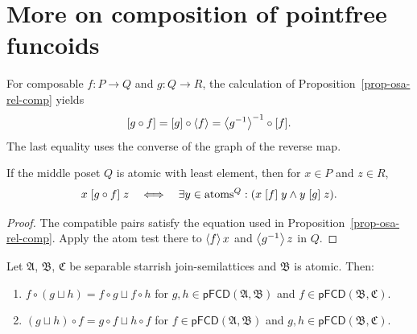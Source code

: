 \section{More on composition of pointfree funcoids}
For composable $f:P\to Q$ and $g:Q\to R$, the calculation of
Proposition~\ref{prop-osa-rel-comp} yields
\[
 \mathord{\mathrel{\left[g\circ f\right]}}
 =\mathord{\mathrel{\left[g\right]}}\circ\left\langle f\right\rangle
 =\left\langle g^{-1}\right\rangle^{-1}\circ\mathord{\mathrel{\left[f\right]}}.
\]
The last equality uses the converse of the graph of the reverse map.
\begin{thm}\label{pf-fcd-atom-middle}
If the middle poset $Q$ is atomic with least element, then for
$x\in P$ and $z\in R$,
\[
 x\mathrel{\left[g\circ f\right]}z\quad\Longleftrightarrow\quad
 \exists y\in\operatorname{atoms}^Q:(x\mathrel{\left[f\right]}y\land y\mathrel{\left[g\right]}z).
\]
\end{thm}
\begin{proof}
The compatible pairs satisfy the equation used in
Proposition~\ref{prop-osa-rel-comp}. Apply the atom test there to
$\left\langle f\right\rangle x$ and $\left\langle g^{-1}\right\rangle z$ in $Q$.
\end{proof}
\begin{thm}
Let $\mathfrak{A}$, $\mathfrak{B}$, $\mathfrak{C}$ be separable
starrish join-semilattices and $\mathfrak{B}$ is atomic. Then:
\begin{enumerate}
\item $f\circ(g\sqcup h)=f\circ g\sqcup f\circ h$ for $g,h\in\mathsf{pFCD}(\mathfrak{A},\mathfrak{B})$
and $f\in\mathsf{pFCD}(\mathfrak{B},\mathfrak{C})$.
\item $(g\sqcup h)\circ f=g\circ f\sqcup h\circ f$ for $f\in\mathsf{pFCD}(\mathfrak{A},\mathfrak{B})$
and $g,h\in\mathsf{pFCD}(\mathfrak{B},\mathfrak{C})$.
\end{enumerate}
\end{thm}
